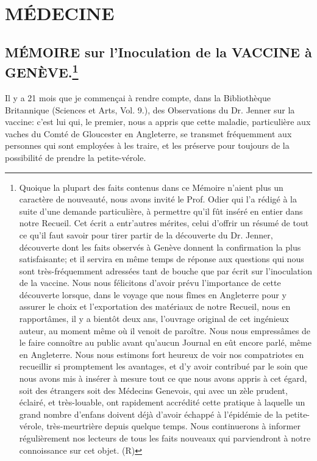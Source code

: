 \setcounter{page}{71}
\chapter{MÉDECINE}
\section{MÉMOIRE sur l'Inoculation de la VACCINE à GENÈVE.\footnote{Quoique la plupart des faits contenus dans ce Mémoire n'aient plus un caractère de nouveauté, nous avons invité le Prof. Odier qui l'a rédigé à la suite d'une demande particulière, à permettre qu'il fût inséré en entier dans notre Recueil. Cet écrit a entr'autres mérites, celui d'offrir un résumé de tout ce qu'il faut savoir pour tirer partir de la découverte du Dr. Jenner, découverte dont les faits observés à Genève donnent la confirmation la plus satisfaisante; et il servira en même temps de réponse aux questions qui nous sont très-fréquemment adressées tant de bouche que par écrit sur l'inoculation de la vaccine. Nous nous félicitons d'avoir prévu l'importance de cette découverte lorsque, dans le voyage que nous fîmes en Angleterre pour y assurer le choix et l'exportation des matériaux de notre Recueil, nous en rapportâmes, il y a bientôt deux ans, l'ouvrage original de cet ingénieux auteur, au moment même où il venoit de paroître. Nous nous empressâmes de le faire connoître au public avant qu'aucun Journal en eût encore parlé, même en Angleterre. Nous nous estimons fort heureux de voir nos compatriotes en recueillir si promptement les avantages, et d'y avoir contribué par le soin que nous avons mis à insérer à mesure tout ce que nous avons appris à cet égard, soit des étrangers soit des Médecins Genevois, qui avec un zèle prudent, éclairé, et très-louable, ont rapidement accrédité cette pratique à laquelle un grand nombre d'enfans doivent déjà d'avoir échappé à l'épidémie de la petite-vérole, très-meurtrière depuis quelque temps. Nous continuerons à informer régulièrement nos lecteurs de tous les faits nouveaux qui parviendront à notre connoissance sur cet objet. (R)}}
Il y a 21 mois que je commençai à rendre compte, dans la Bibliothèque Britannique (Sciences et Arts, Vol. 9.), des Observations du Dr. Jenner sur la vaccine: c'est lui qui, le premier, nous a appris que cette maladie, particulière aux vaches du Comté de Gloucester\setcounter{page}{72} en Angleterre, se transmet fréquemment aux personnes qui sont employées à les traire, et les préserve pour toujours de la possibilité de prendre la petite-vérole.
